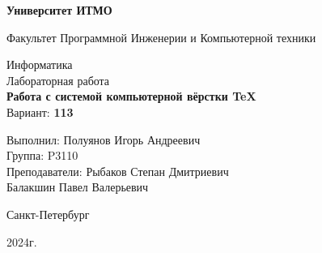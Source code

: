 \thispagestyle{empty}
\begin{center}
    \textbf{Университет ИТМО}

    \vspace{1em}
    Факультет Программной Инженерии и Компьютерной техники

    \vspace{20em}
    
    {\Large Информатика}\\[1em]
    {\Large Лабораторная работа }\\[1em]
    {\Large \textbf{Работа с системой компьютерной вёрстки \TeX}}\\[1em]
    Вариант: \textbf{113}
\end{center}

\vspace{12em}

\begin{flushright}
    Выполнил:
    Полуянов Игорь Андреевич\\
    Группа: P3110\\
    Преподаватели:
    Рыбаков Степан Дмитриевич\\
    Балакшин Павел Валерьевич \\
\end{flushright}
\vspace{8em}
\vspace{\fill}

\begin{center}
Санкт-Петербург

2024г.
\end{center}